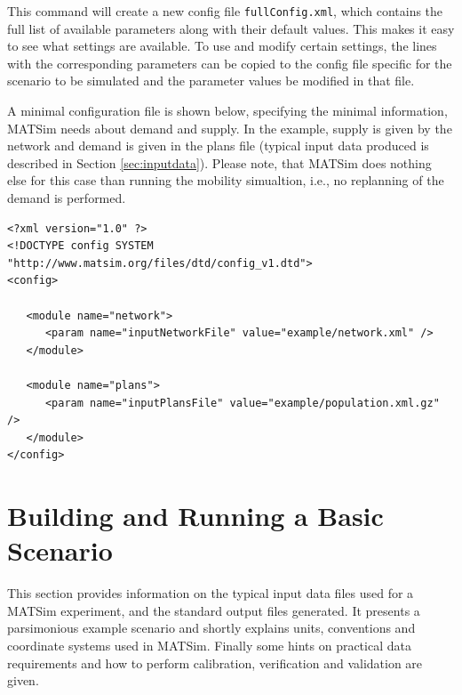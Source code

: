 This command will create a new config file \lstinline|fullConfig.xml|, which contains the full list of available parameters along with their default values. This makes it easy to see what settings are available. To use and modify certain settings, the lines with the corresponding parameters can be copied to the config file specific for the scenario to be simulated and the parameter values be modified in that file. 

A minimal configuration file is shown below, specifying the minimal information, MATSim needs about demand and supply. In the example, supply is given by the network and demand is given in the plans file (typical input data produced is described in Section \ref{sec:inputdata}). Please note, that MATSim does nothing else for this case than running the mobility simualtion, i.e., no replanning of the demand is performed.

\begin{lstlisting}
<?xml version="1.0" ?> 
<!DOCTYPE config SYSTEM "http://www.matsim.org/files/dtd/config_v1.dtd"> 
<config> 
 
   <module name="network"> 
      <param name="inputNetworkFile" value="example/network.xml" /> 
   </module> 
 
   <module name="plans"> 
      <param name="inputPlansFile" value="example/population.xml.gz" /> 
   </module> 
</config>
\end{lstlisting}

\section{Building and Running a Basic Scenario}
\label{sec:buildingbasicscenario}
This section provides information on the typical input data files used for a MATSim experiment, and the standard output files generated. It presents a parsimonious example scenario and shortly explains units, conventions and coordinate systems used in MATSim. Finally some hints on practical data requirements and how to perform calibration, verification and validation are given.

